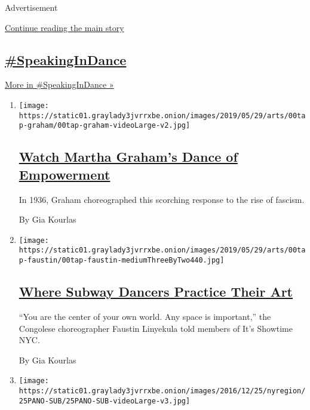 Advertisement

\protect\hyperlink{after-mid1}{Continue reading the main story}

\hypertarget{speakingindance}{%
\subsection{\texorpdfstring{\href{/column/speakingindance}{\#SpeakingInDance}}{\#SpeakingInDance}}\label{speakingindance}}

\href{/column/speakingindance}{More in \#SpeakingInDance »}

\begin{enumerate}
\def\labelenumi{\arabic{enumi}.}
\item
  \texttt{[image: https://static01.graylady3jvrrxbe.onion/images/2019/05/29/arts/00tap-graham/00tap-graham-videoLarge-v2.jpg]}

  \hypertarget{watch-martha-grahams-dance-of-empowerment}{%
  \subsection{\texorpdfstring{\href{/interactive/2019/05/30/arts/dance/speaking-in-dance-martha-graham.html}{Watch
  Martha Graham's Dance of
  Empowerment}}{Watch Martha Graham's Dance of Empowerment}}\label{watch-martha-grahams-dance-of-empowerment}}

  In 1936, Graham choreographed this scorching response to the rise of
  fascism.

  By Gia Kourlas
\item
  \texttt{[image: https://static01.graylady3jvrrxbe.onion/images/2019/05/29/arts/00tap-faustin/00tap-faustin-mediumThreeByTwo440.jpg]}

  \hypertarget{where-subway-dancers-practice-their-art}{%
  \subsection{\texorpdfstring{\href{/interactive/2019/05/30/arts/dance/speaking-in-dance-showtime-faustin.html}{Where
  Subway Dancers Practice Their
  Art}}{Where Subway Dancers Practice Their Art}}\label{where-subway-dancers-practice-their-art}}

  ``You are the center of your own world. Any space is important,'' the
  Congolese choreographer Faustin Linyekula told members of It's
  Showtime NYC.

  By Gia Kourlas
\item
  \texttt{[image: https://static01.graylady3jvrrxbe.onion/images/2016/12/25/nyregion/25PANO-SUB/25PANO-SUB-videoLarge-v3.jpg]}


\end{enumerate}
